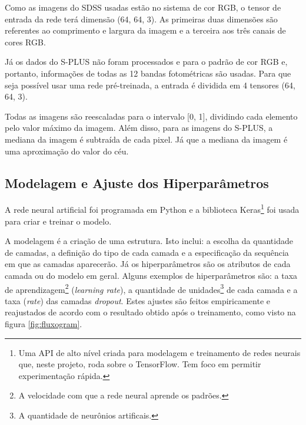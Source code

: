 Como as imagens do SDSS usadas estão no sistema de cor RGB, o tensor de entrada da rede terá dimensão (64, 64, 3). As primeiras duas dimensões são referentes ao comprimento e largura da imagem e a terceira aos três canais de cores RGB.

Já os dados do S-PLUS não foram processados e para o padrão de cor RGB e, portanto, informações de todas as 12 bandas fotométricas são usadas. Para que seja possível usar uma rede pré-treinada, a entrada é dividida em 4 tensores (64, 64, 3).

Todas as imagens são reescaladas para o intervalo [0, 1], dividindo cada elemento pelo valor máximo da imagem. Além disso, para as imagens do S-PLUS, a mediana da imagem é subtraída de cada pixel. Já que a mediana da imagem é uma aproximação do valor do céu.

\subsection{Modelagem e Ajuste dos Hiperparâmetros}

A rede neural artificial foi programada em Python e a biblioteca Keras\footnote{Uma API de alto nível criada para modelagem e treinamento de redes neurais que, neste projeto, roda sobre o TensorFlow. Tem foco em permitir experimentação rápida.} foi usada para criar e treinar o modelo.

A modelagem é a criação de uma estrutura. Isto inclui: a escolha da quantidade de camadas, a definição do tipo de cada camada e a especificação da sequência em que as camadas aparecerão. Já os hiperparâmetros são os atributos de cada camada ou do modelo em geral. Alguns exemplos de hiperparâmetros são: a taxa de aprendizagem\footnote{A velocidade com que a rede neural aprende os padrões.} (\emph{learning rate}), a quantidade de unidades\footnote{A quantidade de neurônios artificais.} de cada camada e a taxa (\emph{rate}) das camadas \emph{dropout}. Estes ajustes são feitos empiricamente e reajustados de acordo com o resultado obtido após o treinamento, como visto na figura \ref{fig:fluxogram}.

